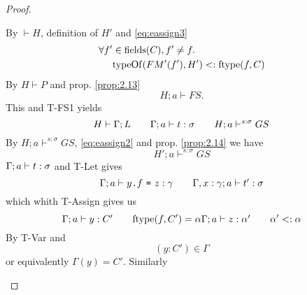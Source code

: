 \begin{proof}
\begin{description}
\begin{description}
\begin{description}
              By $\vdash H$, definition of $H'$ and \eqref{eq:eassign3}
              \begin{equation} \label{eq:eassign4}
                \begin{aligned}
                  \forall f' &\in \mbox{$\mathrm{fields}$}(C), f' \neq f. \\ 
                                 &\mbox{$\mathrm{typeOf}$}(FM'(f'), H') <: \mbox{$\mathrm{ftype}$}(f, C)
                \end{aligned}
              \end{equation}
              By $H \vdash P$ and prop. \ref{prop:2.13}
              \begin{equation} \label{eq:eassign5}
                H;a \vdash FS.
              \end{equation}
              This and {\sc T-FS1} yields
              \begin{equation}\label{eq:eassign6}
                H \vdash \Gamma; L \quad\quad \mbox{$\Gamma;a\vdash t:\sigma$}
                \quad\quad H; a \vdash^{s: \sigma} GS
              \end{equation}
              By $H;a \vdash^{s: \sigma} GS$, \eqref{eq:eassign2} and prop.
              \ref{prop:2.14} we have 
              \begin{equation} \label{eq:eassign7} 
                H'; a \vdash^{s: \sigma} GS
              \end{equation}
              $\mbox{$\Gamma;a\vdash t:\sigma$}$ and {\sc T-Let} gives
              \begin{equation} \label{eq:eassign8}
                \mbox{$\Gamma;a\vdash\mbox{$y$\texttt{.}$f$~\texttt{=}~$z$}:\gamma$} \quad\quad
                \mbox{$\Gamma, x: \gamma;a\vdash t':\sigma$}
              \end{equation}
              which whith {\sc T-Assign} gives us
              \begin{equation} \label{eq:eassign9}
                \mbox{$\Gamma;a\vdash y:C'$} \quad\quad \mbox{$\mathrm{ftype}$}(f, C') = \alpha \\
                \mbox{$\Gamma;a\vdash z:\alpha'$} \quad\quad \alpha' <: \alpha
              \end{equation}
              By {\sc T-Var} and 
              \begin{equation}\label{eq:eassign10}
                (y: C') \in \Gamma 
              \end{equation}
              or equivalently $\Gamma(y) = C'$.
              Similarly
              \begin{equation} \label{eq:eassign11}

\end{equation}
\end{description}
\end{description}
\end{description}
\end{proof}
